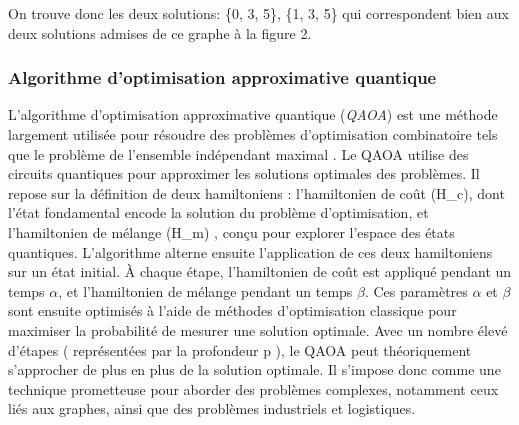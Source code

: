 \documentclass[11pt]{article}
\begin{document}
On trouve donc les deux solutions: \{0, 3, 5\}, \{1, 3, 5\} qui correspondent bien aux deux solutions admises de ce graphe à la figure 2.



\subsubsection{Algorithme d'optimisation approximative quantique} 
 
 L'algorithme d'optimisation approximative quantique (\textit{QAOA}) est une méthode largement utilisée pour résoudre des problèmes d'optimisation combinatoire tels que le problème de l'ensemble indépendant maximal \cite{farhi_quantum_2014}. Le QAOA utilise des circuits quantiques pour approximer les solutions optimales des problèmes. Il repose sur la définition de deux hamiltoniens : l'hamiltonien de coût (H\_c), dont l'état fondamental encode la solution du problème d’optimisation, et l'hamiltonien de mélange (H\_m) , conçu pour explorer l'espace des états quantiques. 
 L'algorithme alterne ensuite l'application de ces deux hamiltoniens sur un état initial. À chaque étape, l'hamiltonien de coût est appliqué pendant un temps $\alpha$, et l'hamiltonien de mélange pendant un temps $\beta$.  Ces paramètres $\alpha$ et $\beta$ sont ensuite optimisés à l'aide de méthodes d'optimisation classique pour maximiser la probabilité de mesurer une solution optimale.
 Avec un nombre élevé d'étapes ( représentées par la profondeur p ), le QAOA peut théoriquement s'approcher de plus en plus de la solution optimale. Il s'impose donc comme une technique prometteuse pour aborder des problèmes complexes, notamment ceux liés aux graphes, ainsi que des problèmes industriels et logistiques.
\end{document}

